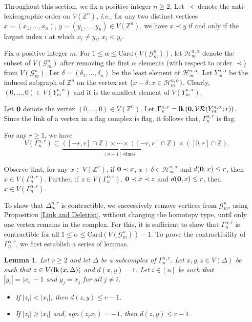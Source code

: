 \documentclass{amsart}
\newtheorem{lemma}[theorem]{Lemma}
\theoremstyle{definition}
\theoremstyle{remark}
\numberwithin{equation}{section}
\newcommand{\lk}{\mbox{\upshape lk}\,}
\newcommand{\D}{\Delta}
\newcommand{\G}{\mathcal{G}}
\newcommand{\vr}[2]{\mathcal{VR}(#1;#2)}
\def\Z{{\mathbb{Z}}}
\begin{document}
Throughout this section, we fix a positive integer $n \geq 2$. Let $\prec$ denote the  anti-lexicographic order on $V(\Z^n)$, {\it i.e.,}   for any two distinct vertices  $x = (x_1, \dots, x_n)$, $y = (y_1, \dots, y_n) \in V(\Z^n)$, we have $x \prec y$ if and only if the largest index $i$ at which $x_i \neq y_i$,  $x_i < y_i$. 


Fix a positive integer $m$.  For $1 \leq \alpha \leq \mathrm{Card}(V(\G_m^n))$,  let $\mathcal{H}_m^{n, \alpha}$ denote the subset of $V(\G_m^n)$ after removing the first $\alpha$ elements (with respect to order $\prec$) from 
$V(\G_m^n)$. Let $\delta= (\delta_1 , \ldots, \delta_n)$ be the least element of $\mathcal{H}_m^{n, \alpha}$.  Let $Y_m^{n, \alpha}$ be the induced subgraph of $\Z^n$ on the vertex set 
$ \{x-\delta: x \in \mathcal{H}_m^{n, \alpha}\}$.  Clearly, $(0, \ldots, 0) \in V(Y_m^{n, \alpha})$ and it is the smallest element of $V(Y_m^{n, \alpha})$.

Let $\bf{0}$ denote the vertex  $(0, \ldots, 0) \in V(\Z^n)$. Let $\Gamma_n^{\alpha,r}=\lk({\bf{0}},\vr{Y_m^{n, \alpha}}{r})$. Since the link of a vertex in a flag complex is flag, it follows that, $\Gamma_n^{\alpha,r}$ is flag.


For any  $r \geq 1$, we have 
$$V(\Gamma_{n}^{\alpha,r})\subseteq \underbrace{([-r,r]\cap \Z)\times\cdots\times([-r,r]\cap\Z)}_{(n-1)\text{-times}}\times([0,r]\cap\Z).$$



Observe that, for any  $x \in V(\Z^n)$,  if ${\bf{0}} \prec x$, $x+ \delta \in \mathcal{H}_m^{n, \alpha}$  and $d({\bf{0}}, x) \leq r$, then $x \in  V(\Gamma_n^{\alpha, r})$. Further, if $z \in V(\Gamma_n^{\alpha, r})$, ${\bf{0}} \prec x \prec z$ and $d({\bf{0}}, x) \leq r$, then  $x \in  V(\Gamma_n^{\alpha, r})$.


To show that $\Delta_m^{n,r}$ is contractible, we successively remove vertices from $\G_m^n$, using Proposition \ref{Link and Deletion}, without changing the homotopy type, until only one vertex remains in the complex. For this, it is sufficient to show that $\Gamma_n^{\alpha,r}$ is contractible for all $1 \le \alpha \le \mathrm{Card}(V(\G_m^n)) - 1$. To prove the contractibility of $\Gamma_n^{\alpha,r}$, we first establish a series of lemmas. 



\begin{lemma}\label{onevetex}
	Let $r\geq 2$ and let  $\D$ be  a subcomplex of $\Gamma_n^{\alpha, r}$. Let $x,y,z\in V(\D)$ be  such that $z\in V(\lk(x,\D))$ and  $d(x,y)=1$. Let $i \in [n]$ be such that   $|y_i|=|x_i|-1$ and $y_j=x_j$  for all $j\neq i$. 
	
	
	
	\begin{itemize}
		\item[(i)] If $|z_i|<|x_i|$, then $d(z,y) \leq r-1$. 
		\item[(ii)] If $|z_i|\geq |x_i|$ and, $sgn(z_ix_i)=-1$, then $d(z,y)\leq r-1$.
	\end{itemize}
\end{lemma}
\end{document}
